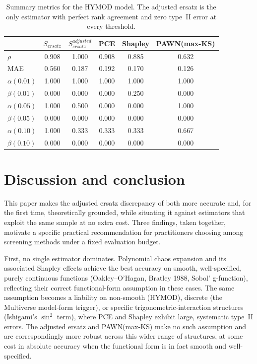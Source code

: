 \documentclass[12pt]{article}
\begin{document}
\begin{table}[H]
\centering
\begin{tabular}{@{}l|ccccc@{}} \toprule
 & $S_{ersatz}$ & $S^{adjusted}_{ersatz}$ & PCE & Shapley & PAWN(max-KS) \\ \midrule
$\rho$           & 0.908 & 1.000 & 0.908 & 0.885 & 0.632 \\
MAE              & 0.560 & 0.187 & 0.192 & 0.170 & 0.126 \\
$\alpha(0.01)$   & 1.000 & 1.000 & 1.000 & 1.000 & 1.000 \\
$\beta(0.01)$    & 0.000 & 0.000 & 0.000 & 0.250 & 0.000 \\
$\alpha(0.05)$   & 1.000 & 0.500 & 0.000 & 0.000 & 1.000 \\
$\beta(0.05)$    & 0.000 & 0.000 & 0.000 & 0.000 & 0.000 \\
$\alpha(0.10)$   & 1.000 & 0.333 & 0.333 & 0.333 & 0.667 \\
$\beta(0.10)$    & 0.000 & 0.000 & 0.000 & 0.000 & 0.000 \\ \bottomrule
\end{tabular}
\caption{Summary metrics for the HYMOD model. The adjusted ersatz is the only estimator with perfect rank agreement and zero type~II error at every threshold.}
\label{tab:hymod_summary}
\end{table}

\section{Discussion and conclusion}

This paper makes the adjusted ersatz discrepancy of \citet{puy2024discrepancy} both more accurate and, for the first time, theoretically grounded, while situating it against estimators that exploit the same sample at no extra cost. Three findings, taken together, motivate a specific practical recommendation for practitioners choosing among screening methods under a fixed evaluation budget.

First, no single estimator dominates. Polynomial chaos expansion and its associated Shapley effects achieve the best accuracy on smooth, well-specified, purely continuous functions (Oakley--O'Hagan, Bratley 1988, Sobol' g-function), reflecting their correct functional-form assumption in these cases. The same assumption becomes a liability on non-smooth (HYMOD), discrete (the Multiverse model-form trigger), or specific trigonometric-interaction structures (Ishigami's $\sin^2$ term), where PCE and Shapley exhibit large, systematic type~II errors. The adjusted ersatz and PAWN(max-KS) make no such assumption and are correspondingly more robust across this wider range of structures, at some cost in absolute accuracy when the functional form is in fact smooth and well-specified.
\end{document}
